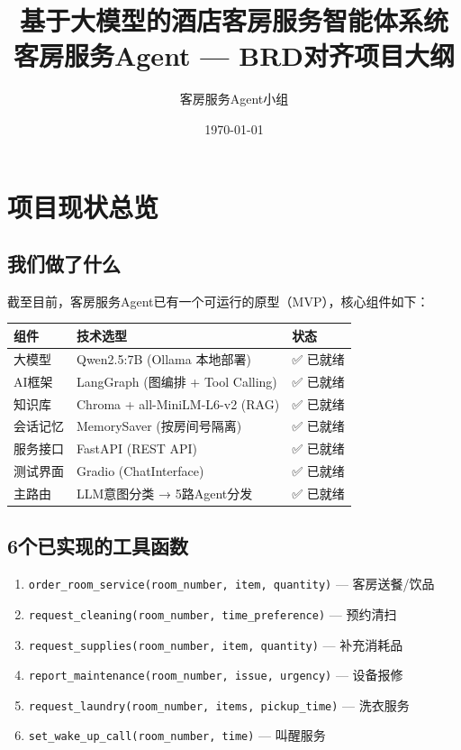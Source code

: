\documentclass[12pt,a4paper]{ctexart}
\title{\Huge \textbf{基于大模型的酒店客房服务智能体系统}\\ \Large 客房服务Agent — BRD对齐项目大纲}
\author{客房服务Agent小组}
\date{\today}
\begin{document}
\maketitle
\tableofcontents
\newpage

\section{项目现状总览}

\subsection{我们做了什么}

截至目前，客房服务Agent已有一个可运行的原型（MVP），核心组件如下：

\begin{table}[h]
\centering
\begin{tabular}{@{}lll@{}}
\toprule
\textbf{组件} & \textbf{技术选型} & \textbf{状态} \\
\midrule
大模型 & Qwen2.5:7B (Ollama 本地部署) & ✅ 已就绪 \\
AI框架 & LangGraph (图编排 + Tool Calling) & ✅ 已就绪 \\
知识库 & Chroma + all-MiniLM-L6-v2 (RAG) & ✅ 已就绪 \\
会话记忆 & MemorySaver (按房间号隔离) & ✅ 已就绪 \\
服务接口 & FastAPI (REST API) & ✅ 已就绪 \\
测试界面 & Gradio (ChatInterface) & ✅ 已就绪 \\
主路由 & LLM意图分类 → 5路Agent分发 & ✅ 已就绪 \\
\bottomrule
\end{tabular}
\end{table}

\subsection{6个已实现的工具函数}

\begin{enumerate}
    \item \texttt{order\_room\_service(room\_number, item, quantity)} — 客房送餐/饮品
    \item \texttt{request\_cleaning(room\_number, time\_preference)} — 预约清扫
    \item \texttt{request\_supplies(room\_number, item, quantity)} — 补充消耗品
    \item \texttt{report\_maintenance(room\_number, issue, urgency)} — 设备报修
    \item \texttt{request\_laundry(room\_number, items, pickup\_time)} — 洗衣服务
    \item \texttt{set\_wake\_up\_call(room\_number, time)} — 叫醒服务
\end{enumerate}
\end{document}
